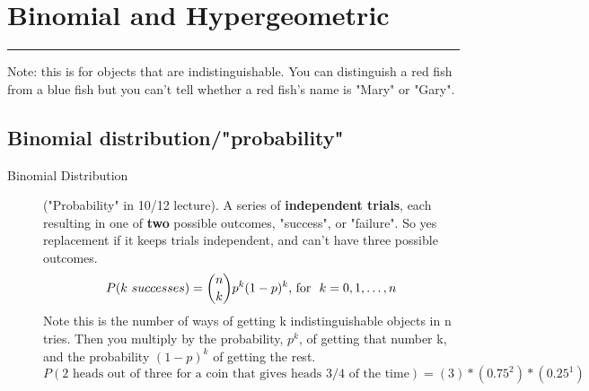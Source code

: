 \section{Binomial and Hypergeometric}\smallskip \hrule height 2pt \smallskip
Note: this is for objects that are indistinguishable.  You can distinguish a red fish from a blue fish but you can't tell whether a red fish's name is "Mary" or "Gary". 
\hfill \\

\subsection{Binomial distribution/"probability"}
	\begin{description}
		
		\item[Binomial Distribution] ("Probability" in 10/12 lecture). A series of \textbf{independent trials}, each resulting in one of \textbf{two} possible outcomes, "success", or "failure".  So yes replacement if it keeps trials independent, and can't have three possible outcomes. 
			\[ P(k \mbox \ successes) = {{n}\choose{k}}p^k(1-p)^k \mbox{, for \ } k = 0, 1, \dots, n \]
		Note this is the number of ways of getting k indistinguishable objects in n tries.  Then you multiply by the probability, $p^k$, of getting that number k, and the probability $(1-p)^k$ of getting the rest.  $P(\mbox{2 heads out of three for a coin that gives heads 3/4 of the time}) = (3)*(0.75^2)*(0.25^1)$ \hfill \\
		\hfill \\
	\end{description}

